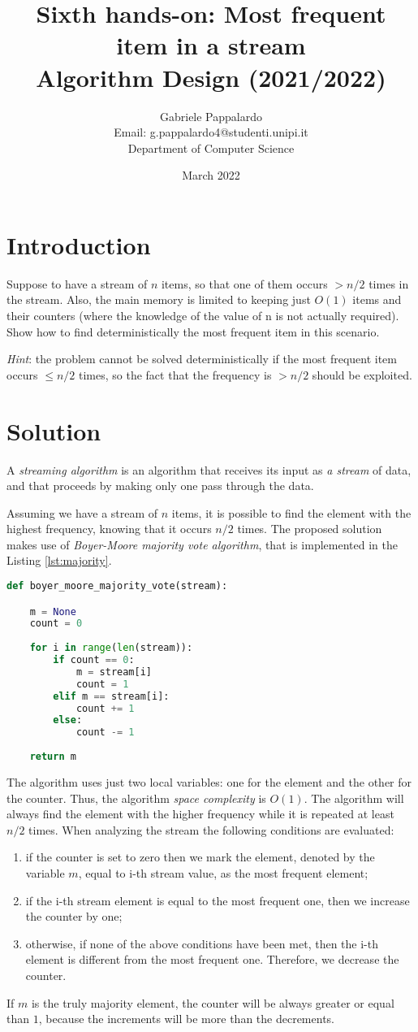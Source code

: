 \documentclass{article}
\title{Sixth hands-on: Most frequent item in a stream \\[1ex] \large Algorithm Design (2021/2022)}
\author{Gabriele Pappalardo\\Email: g.pappalardo4@studenti.unipi.it\\Department of Computer Science}
\date{March 2022}
\begin{document}
\maketitle

\section{Introduction}

Suppose to have a stream of $n$ items, so that one of them occurs $ > n/2 $ times in the stream. 
Also, the main memory is limited to keeping just $O(1)$ items and their counters (where the knowledge of the value of n is not actually required). Show how to find deterministically the most frequent item in this scenario.
\newline

\noindent \textit{Hint}: the problem cannot be solved deterministically if the most frequent item occurs $\le n/2$ times, so the fact that the frequency is $> n/2$ should be exploited.

\section{Solution}
A \textit{streaming algorithm} is an algorithm that receives its input as \textit{a stream} of data, 
and that proceeds by making only one pass through the data.

\noindent Assuming we have a stream of $n$ items, it is possible to find the element with the highest frequency, knowing that it occurs $n/2$ times. The proposed solution makes use of \textit{Boyer-Moore majority vote algorithm}, that is implemented in the Listing \ref{lst:majority}.

\begin{lstlisting}[language=Python,caption="Boyer-Moore majority vote algorithm",label={lst:majority}]
def boyer_moore_majority_vote(stream):

	m = None
	count = 0
	
	for i in range(len(stream)):
		if count == 0:
			m = stream[i]
			count = 1
		elif m == stream[i]:
			count += 1
		else:
			count -= 1
	
	return m
\end{lstlisting}

\noindent The algorithm uses just two local variables: one for the element and the other for the counter. Thus, the algorithm  \textit{space complexity} is $O(1)$. The algorithm will always find the element with the higher frequency while it is repeated at least $n/2$ times. When analyzing the stream the following conditions are evaluated:
\begin{enumerate}
    \item if the counter is set to zero then we mark the element, denoted by the variable $m$, equal to i-th stream value, as the most frequent element;
    \item if the i-th stream element is equal to the most frequent one, then we increase the counter by one;
    \item otherwise, if none of the above conditions have been met, then the i-th element is different from the most frequent one. Therefore, we decrease the counter.
\end{enumerate}

\noindent If $m$ is the truly majority element, the counter will be always greater or equal than $1$, because the increments will be more than the decrements.
\end{document}
